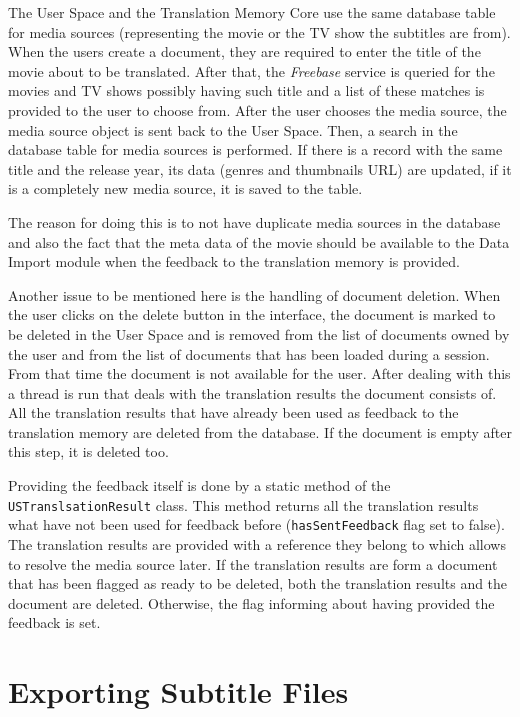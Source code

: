 The User Space and the Translation Memory Core use the same database table for media sources (representing the movie or the TV show the subtitles are from). When the users create a document, they are required to enter the title of the movie about to be translated. After that, the {\it Freebase} service is queried for the movies and TV shows possibly having such title and a list of these matches is provided to the user to choose from. After the user chooses the media source, the media source object is sent back to the User Space. Then, a search in the database table for media sources is performed. If there is a record with the same title and the release year, its data (genres and thumbnails URL) are updated, if it is a completely new media source, it is saved to the table.

The reason for doing this is to not have duplicate media sources in the database and also the fact that the meta data of the movie should be available to the Data Import module when the feedback to the translation memory is provided.

Another issue to be mentioned here is the handling of document deletion. When the user clicks on the delete button in the interface, the document is marked to be deleted in the User Space and is removed from the list of documents owned by the user and from the list of documents that has been loaded during a session. From that time the document is not available for the user. After dealing with this a thread is run that deals with the translation results the document consists of. All the translation results that have already been used as feedback to the translation memory are deleted from the database. If the document is empty after this step, it is deleted too.

Providing the feedback itself is done by a static method of the {\tt USTranslsationResult} class. This method returns all the translation results what have not been used for feedback before ({\tt hasSentFeedback} flag set to false). The translation results are provided with a reference they belong to which allows to resolve the media source later. If the translation results are form a document that has been flagged as ready to be deleted, both the translation results and the document are deleted. Otherwise, the flag informing about having provided the feedback is set.

\section{Exporting Subtitle Files}
\label{sec:export}

